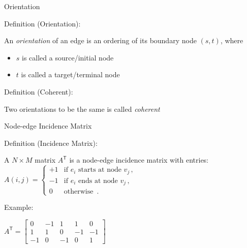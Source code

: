 \documentclass[10pt,ignorenonframetext,mathserif]{beamer}
\providecommand{\tightlist}{%
  \setlength{\itemsep}{0pt}\setlength{\parskip}{0pt}}
\begin{document}
\begin{frame}{Orientation}

\begin{block}{Definition (Orientation):}

An \emph{orientation} of an edge is an ordering of its boundary node
\((s, t)\), where

\begin{itemize}
\tightlist
\item
  \(s\) is called a source/initial node
\item
  \(t\) is called a target/terminal node
\end{itemize}

\end{block}

\begin{block}{Definition (Coherent):}

Two orientations to be the same is called \emph{coherent}

\end{block}

\end{frame}

\begin{frame}{Node-edge Incidence Matrix}

\begin{block}{Definition (Incidence Matrix):}

A \(N \times M\) matrix \(A^\mathsf{T}\) is a node-edge incidence matrix with
entries:
\(A(i,j) = \begin{cases} +1 & \text{if } e_i \text{ starts at node } v_j \,, \\ -1 & \text{if } e_i \text{ ends at node } v_j \,, \\ 0 & \text{otherwise } \,. \end{cases}\)

\end{block}

\begin{block}{Example:}

\(A^\mathsf{T} = \begin{bmatrix} 0 & -1 & 1 & 1 & 0 \\ 1 & 1 & 0 & -1 & -1 \\ -1 & 0 & -1 & 0 & 1 \end{bmatrix}\)

\end{block}

\end{frame}
\end{document}
